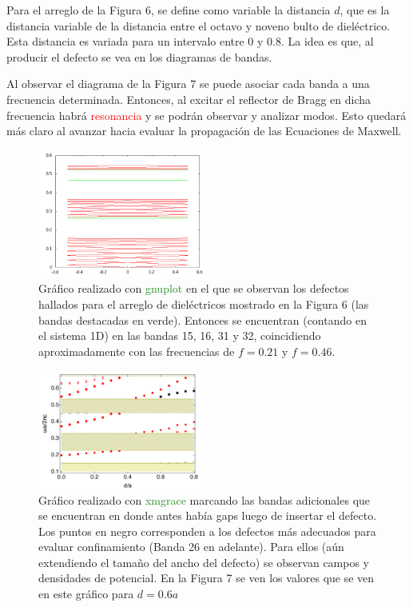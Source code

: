 \documentclass{book}
\begin{document}
Para el arreglo de la Figura 6, se define como variable la distancia $d$, que es la distancia variable de la distancia entre el octavo y noveno bulto de dieléctrico. Esta distancia es variada para un intervalo entre $0$ y $0.8$. La idea es que, al producir el defecto se vea en los diagramas de bandas. 

Al observar el diagrama de la Figura 7 se puede asociar cada banda a una frecuencia determinada. Entonces, al excitar el reflector de Bragg en dicha frecuencia habrá \textcolor{red}{resonancia} y se podrán observar y analizar modos. Esto quedará más claro al avanzar hacia evaluar la propagación de las Ecuaciones de Maxwell.
\pagebreak
\begin{figure}[ht]
 \centering
   \includegraphics[width=0.50\textwidth]{graph.png}
   \caption{Gráfico realizado con \textcolor{ForestGreen}{gnuplot} en el que se observan los defectos hallados para el arreglo de dieléctricos mostrado en la Figura 6 (las bandas destacadas en verde). Entonces se encuentran (contando en el sistema 1D) en las bandas 15, 16, 31 y 32, coincidiendo aproximadamente con las frecuencias de $f=0.21$ y $f=0.46$.}
\end{figure}
\begin{figure}[ht]
 \centering
   \includegraphics[width=0.50\textwidth]{Graph0.png}
   \caption{Gráfico realizado con \textcolor{ForestGreen}{xmgrace} marcando las bandas adicionales que se encuentran en donde antes había gaps luego de insertar el defecto. Los puntos en negro corresponden a los defectos más adecuados para evaluar confinamiento (Banda 26 en adelante). Para ellos (aún extendiendo el tamaño del ancho del defecto) se observan campos y densidades de potencial. En la Figura 7 se ven los valores que se ven en este gráfico para $d=0.6 a$}
\end{figure} 
\end{document}
